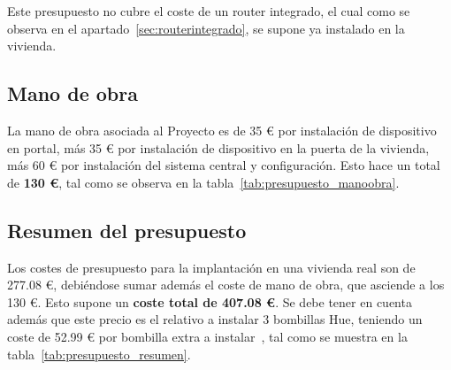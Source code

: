Este presupuesto no cubre el coste de un router integrado, el cual como se observa en el apartado~\ref{sec:routerintegrado}, se supone ya instalado en la vivienda.

    \subsection{Mano de obra}

    La mano de obra asociada al Proyecto es de 35 € por instalación de dispositivo en portal, más 35 € por instalación de dispositivo en la puerta de la vivienda, más 60 € por instalación del sistema central y configuración. Esto hace un total de \textbf{130 €}, tal como se observa en la tabla~\ref{tab:presupuesto_manoobra}.

    \begin{table}[!ht]
        \centering
        \caption{Presupuesto de mano de obra.}
        \label{tab:presupuesto_manoobra}
    \end{table}


    \subsection{Resumen del presupuesto}

    Los costes de presupuesto para la implantación en una vivienda real son de 277.08 €, debiéndose sumar además el coste de mano de obra, que asciende a los 130 €. Esto supone un \textbf{coste total de 407.08 €}. Se debe tener en cuenta además que este precio es el relativo a instalar 3 bombillas Hue, teniendo un coste de 52.99 € por bombilla extra a instalar~\cite{hueindividualprice}, tal como se muestra en la tabla~\ref{tab:presupuesto_resumen}.

